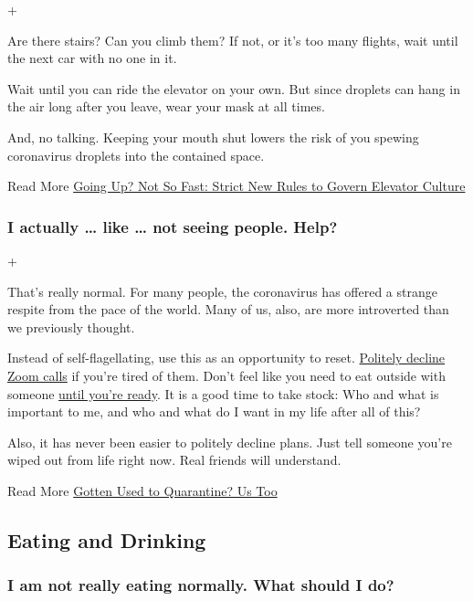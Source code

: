 +

Are there stairs? Can you climb them? If not, or it's too many flights,
wait until the next car with no one in it.

Wait until you can ride the elevator on your own. But since droplets can
hang in the air long after you leave, wear your mask at all times.

And, no talking. Keeping your mouth shut lowers the risk of you spewing
coronavirus droplets into the contained space.

 Read More
\href{https://www.nytimes.com/2020/06/26/health/coronavirus-elevator-reopen.html}{Going
Up? Not So Fast: Strict New Rules to Govern Elevator Culture}

\hypertarget{i-actually--like--not-seeing-people-help}{%
\subsubsection{I actually \ldots{} like \ldots{} not seeing people.
Help?}\label{i-actually--like--not-seeing-people-help}}

+

That's really normal. For many people, the coronavirus has offered a
strange respite from the pace of the world. Many of us, also, are more
introverted than we previously thought.

Instead of self-flagellating, use this as an opportunity to reset.
\href{https://www.nytimes.com/2020/05/20/smarter-living/coronavirus-zoom-facetime-fatigue.html}{Politely
decline Zoom calls} if you're tired of them. Don't feel like you need to
eat outside with someone
\href{https://www.nytimes.com/2020/07/09/style/coronavirus-backyard-entertaining.html}{until
you're ready}. It is a good time to take stock: Who and what is
important to me, and who and what do I want in my life after all of
this?

Also, it has never been easier to politely decline plans. Just tell
someone you're wiped out from life right now. Real friends will
understand.

 Read More
\href{https://www.nytimes.com/2020/06/27/at-home/manage-your-coronavirus-anxiety.html}{Gotten
Used to Quarantine? Us Too}

\hypertarget{eating-and-drinking}{%
\subsection{Eating and Drinking}\label{eating-and-drinking}}

\hypertarget{i-am-not-really-eating-normally-what-should-i-do}{%
\subsubsection{I am not really eating normally. What should I
do?}\label{i-am-not-really-eating-normally-what-should-i-do}}

